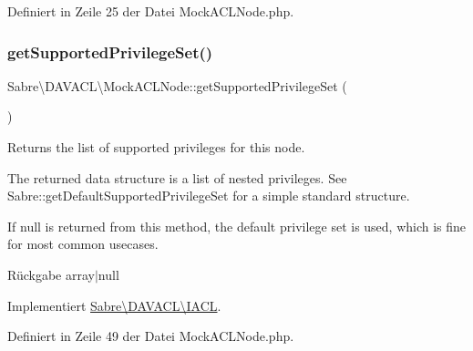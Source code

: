 Definiert in Zeile 25 der Datei Mock\+A\+C\+L\+Node.\+php.

\mbox{\label{class_sabre_1_1_d_a_v_a_c_l_1_1_mock_a_c_l_node_a9fe13e6c41773c26427f9b1ab46b3c8f}} 
\subsubsection{\texorpdfstring{get\+Supported\+Privilege\+Set()}{getSupportedPrivilegeSet()}}
{\footnotesize\ttfamily Sabre\textbackslash{}\+D\+A\+V\+A\+C\+L\textbackslash{}\+Mock\+A\+C\+L\+Node\+::get\+Supported\+Privilege\+Set (\begin{DoxyParamCaption}{ }\end{DoxyParamCaption})}

Returns the list of supported privileges for this node.

The returned data structure is a list of nested privileges. See Sabre\+::get\+Default\+Supported\+Privilege\+Set for a simple standard structure.

If null is returned from this method, the default privilege set is used, which is fine for most common usecases.

\begin{DoxyReturn}{Rückgabe}
array$\vert$null 
\end{DoxyReturn}


Implementiert \mbox{\hyperlink{interface_sabre_1_1_d_a_v_a_c_l_1_1_i_a_c_l_a9db850218d4002ed21bbd87665e0c614}{Sabre\textbackslash{}\+D\+A\+V\+A\+C\+L\textbackslash{}\+I\+A\+CL}}.



Definiert in Zeile 49 der Datei Mock\+A\+C\+L\+Node.\+php.

\mbox{\label{class_sabre_1_1_d_a_v_a_c_l_1_1_mock_a_c_l_node_a97023e609682d3ed8b6df9ef6d2004eb}} 
